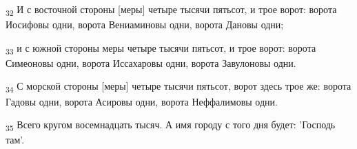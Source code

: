 \begin{tcolorbox}
\textsubscript{32} И с восточной стороны [меры] четыре тысячи пятьсот, и трое ворот: ворота Иосифовы одни, ворота Вениаминовы одни, ворота Дановы одни;
\end{tcolorbox}
\begin{tcolorbox}
\textsubscript{33} и с южной стороны меры четыре тысячи пятьсот, и трое ворот: ворота Симеоновы одни, ворота Иссахаровы одни, ворота Завулоновы одни.
\end{tcolorbox}
\begin{tcolorbox}
\textsubscript{34} С морской стороны [меры] четыре тысячи пятьсот, ворот здесь трое же: ворота Гадовы одни, ворота Асировы одни, ворота Неффалимовы одни.
\end{tcolorbox}
\begin{tcolorbox}
\textsubscript{35} Всего кругом восемнадцать тысяч. А имя городу с того дня будет: 'Господь там'.
\end{tcolorbox}
